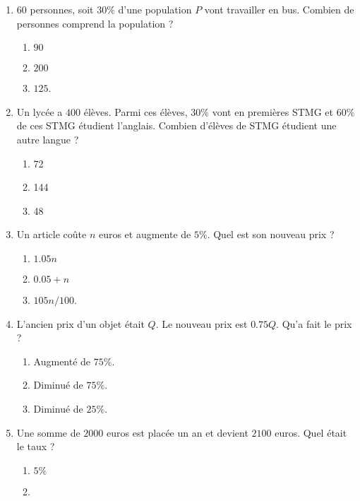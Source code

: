 \begin{exercice}
\begin{multicols}{3}
\begin{enumerate}
    \item
        \( 60\) personnes, soit \( 30\%\) d'une population \( P\) vont travailler en bus. Combien de personnes comprend la population ?
        \begin{enumerate}
            \item
                $90$
            \item
                \( 200\)
            \item
                \( 125\).
        \end{enumerate}
    \item
        Un lycée a \( 400\) élèves. Parmi ces élèves, \( 30\%\) vont en premières STMG et \( 60\%\) de ces STMG étudient l'anglais. Combien d'élèves de STMG étudient une autre langue ?
        \begin{enumerate}
            \item
                72
            \item
                144
            \item
                48
        \end{enumerate}
    \item
        Un article coûte \( n\) euros et augmente de \( 5\%\). Quel est son nouveau prix ?
        \begin{enumerate}
            \item
                \( 1.05n\)
            \item
                \( 0.05+n\)
            \item
                \( 105n/100\).
        \end{enumerate}
    \item
        L'ancien prix d'un objet était \( Q\). Le nouveau prix est \( 0.75Q\). Qu'a fait le prix ?
        \begin{enumerate}
            \item
                Augmenté de \( 75\%\).
            \item
                Diminué de \( 75\%\).
            \item
                Diminué de \( 25\%\).
        \end{enumerate}
    \item
        Une somme de \( 2000\) euros est placée un an et devient \( 2100\) euros. Quel était le taux ?
        \begin{enumerate}
            \item
                \( 5\%\)
            \item

\end{enumerate}
\end{enumerate}
\end{multicols}
\end{exercice}
